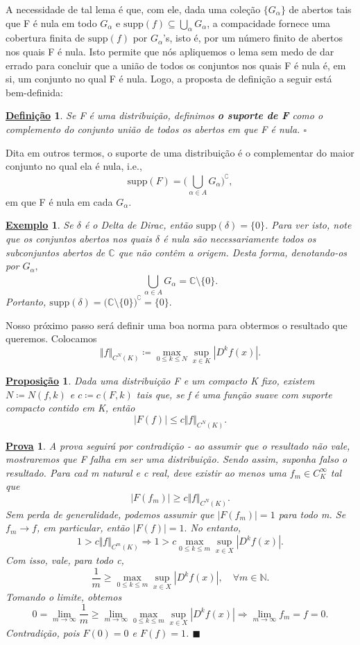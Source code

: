 \documentclass{article}
\newtheorem*{def*}{\underline{Defini\c c\~ao}}
\newtheorem*{prop*}{\underline{Proposi\c c\~ao}}
\newtheorem{example}{\underline{Exemplo}}
\newtheorem*{proof*}{\underline{Prova}}
\renewcommand\qedsymbol{$\blacksquare$}
\begin{document}
  A necessidade de tal lema é que, com ele, dada uma coleção \(\{G_{\alpha }\}\) de abertos tais que F é nula em todo \(G_{\alpha }\) e \(\mathrm{supp}(f)\subseteq \bigcup_{\alpha }^{}G_{\alpha }\), a compacidade fornece uma cobertura finita de 
  \(\mathrm{supp}(f)\) por \(G_{\alpha }\)'s, isto é, por um número finito de abertos nos quais F é nula. Isto permite que nós apliquemos o lema sem medo de dar errado para concluir que a união de todos os conjuntos nos quais F é nula é, em si, um conjunto 
  no qual F é nula. Logo, a proposta de definição a seguir está bem-definida:
 \begin{def*}
   Se F é uma distribuição, definimos \textbf{o suporte de F} como o complemento do conjunto união de todos os abertos em que F é nula. \(\square\)
 \end{def*}
  Dita em outros termos, o suporte de uma distribuição é o complementar do maior conjunto no qual ela é nula, i.e., 
    \[
      \mathrm{supp}(F) = \biggl(\bigcup_{\alpha \in A}^{}G_{\alpha }\biggr)^{\complement},
    \]
  em que F é nula em cada \(G_{\alpha }\).
 \begin{example}
   Se \(\delta \) é o Delta de Dirac, então \(\mathrm{supp}(\delta ) = \{0\}\). Para ver isto, note que os conjuntos abertos nos quais \(\delta \) é nula são necessariamente todos os subconjuntos abertos de \(\mathbb{C}\) que não contêm a origem. Desta forma, denotando-os por \(G_{\alpha },\) 
     \[
       \bigcup_{\alpha \in A}^{}G_{\alpha } = \mathbb{C}\setminus{\{0\}}.
     \]
    Portanto, \(\mathrm{supp}(\delta ) = \biggl(\mathbb{C}\setminus{\{0\}}\biggr)^{\complement} = \{0\}.\)
 \end{example}
 Nosso próximo passo será definir uma boa norma para obtermos o resultado que queremos. Colocamos 
   \[
     \Vert f \Vert_{C^{N}(K)} \coloneqq \max_{0\leq k\leq N}\sup_{x\in K}|D^{k}f(x)|.
   \]
 \begin{prop*}
   Dada uma distribuição F e um compacto K fixo, existem \(N\coloneqq N(f, k)\) e \(c\coloneqq c(F, k)\) tais que, se f é uma função suave com suporte compacto contido em K, então 
     \[
       |F(f)|\leq c\Vert f \Vert_{C^{N}(K)}.
     \]
 \end{prop*}
\begin{proof*}
  A prova seguirá por contradição - ao assumir que o resultado não vale, mostraremos que F falha em ser uma distribuição. Sendo assim, suponha falso o resultado. Para cad m natural e c real, deve existir ao menos uma \(f_{m}\in C_{K}^{\infty}\) tal que 
    \[
      |F(f_{m})| \geq c\Vert f \Vert_{C^{N}(K)}.
    \]
  Sem perda de generalidade, podemos assumir que \(|F(f_{m})| = 1\) para todo m. Se \(f_{m}\to f\), em particular, então \(|F(f)| = 1.\) No entanto, 
    \[
      1 > c \Vert f \Vert_{C^{m}(K)}\Rightarrow 1 > c \max_{0 \leq k \leq m}\sup_{x\in X}|D^{k}f(x)|.
    \]
  Com isso, vale, para todo c, 
    \[
      \frac{1}{m}\geq \max_{0 \leq k \leq m}\sup_{x\in X}|D^{k}f(x)|,\quad \forall m\in \mathbb{N}.
    \]
  Tomando o limite, obtemos 
    \[
      0 = \lim_{m\to \infty}\frac{1}{m} \geq \lim_{m\to \infty}\max_{0\leq k\leq m}\sup_{x\in X}|D^{k}f(x)| \Rightarrow \lim_{m\to \infty}f_{m} = f = 0.
    \]
    Contradição, pois \(F(0) = 0\) e \(F(f) = 1\). \qedsymbol
\end{proof*}
\end{document}
